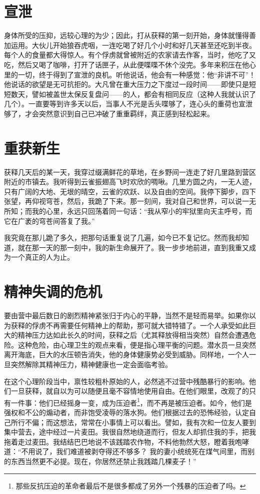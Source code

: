 \documentclass[11pt,oneside]{book}
\begin{document}
\begin{common-format}
\section{宣泄}
身体所受的压抑，远较心理的为少；因此，打从获释的第一刻开始，身体就懂得善加运用。大伙儿开始狼吞虎咽，一连吃喝了好几个小时和好几天甚至还吃到半夜。每个人的食量都大得惊人。有个俘虏就曾被附近的农家请去作客，当时，他吃了又吃，然后又喝了咖啡，打开了话匣子，从此便喋喋不休个没完。多年来积压在他心里的一切，终于得到了宣泄的良机。听他说话，他会有一种感觉：他“非讲不可”！他说话的欲望是无可抗拒的。大凡曾在重大压力之下度过一段时间——即使只是短短数天，譬如被盖世太保反复盘问——的人，都会有相同反应（这种人我就认识了几个）。一直要等到许多天以后，当事人不光是舌头喋够了，连心头的重荷也宣泄够了，才会突然意识到自己已冲破了重重羁绊，真正感到轻松起来。


\section{重获新生}
获释几天后的某一天，我穿过缀满鲜花的草地，在乡野间一连走了好几里路到营区附近的市镇去。我听得到云雀振翅高飞时欢欣的啁啾。几里方圆之内，一无人迹，只有广阔的大地、无垠的晴空，云雀的欢跃、以及自由的空间。我停下脚步，四下张望，再仰视穹苍，然后，我跪了下来。那一刻间，我对自己和世界，可以说一无所知；而我的心里，永远只回荡着同一句话：“我从窄小的牢狱里向天主呼号，而它在广袤的穹苍间答复了我。”

我究竟在那儿跪了多久，把那句话重复说了几遍，如今已不复记忆。然而我却知道，就在那一天的那一刻中，我的新生命展开了。我一步步地前进，直到我重又成为一个真正的人为止。


\section{精神失调的危机}
要由营中最后数日的剧烈精神紧张归于内心的平静，当然不是轻而易举。如果你以为获释的俘虏不再需要任何精神上的帮助，那可就大错特错了。一个人承受如此巨大的精神压力达如此长久的时间，获释之后（尤其释放得相当突然）自然会遭遇危险。这种危险，由心理卫生的观点来看，便是指心理平衡的问题。潜水员一旦突然离开海底，巨大的水压顿告消失，他的身体健康势必受到威胁。同样地，一个人一旦突然解除其精神压力，精神健康也一定会面临考验。

在这个心理阶段当中，禀性较粗朴原始的人，必然逃不过营中残酷暴行的影响。他们一旦获释，就自以为可以随便且毫不容情地使用自由。在他们眼里，改观了的只有一件事：他们已经摇身一变，成为压迫者\footnote{那些反抗压迫的革命者最后不是很多都成了另外一个残暴的压迫者了吗。}，而不再是被压迫者。如今，他们是强权和不公的煽动者，而非饱受凌辱的落水狗。他们根据过去的恐怖经验，认定自己所行不偏；而这想法，常常在小事情上可以看出。譬如，我有次和一位友人要到集中营去，途中经过一片麦田。我很自然地绕道而行，但友人却抓住我的手，把我拖着走过麦田。我结结巴巴地说不该践踏农作物，不料他勃然大怒，瞪着我咆哮道：“不用说了，我们难道被剥夺得还不够多？ 我的妻小统统死在煤气间里，而别的东西当然更不必提。现在，你居然还禁止我践踏几棵麦子！”


\end{common-format}
\end{document}
